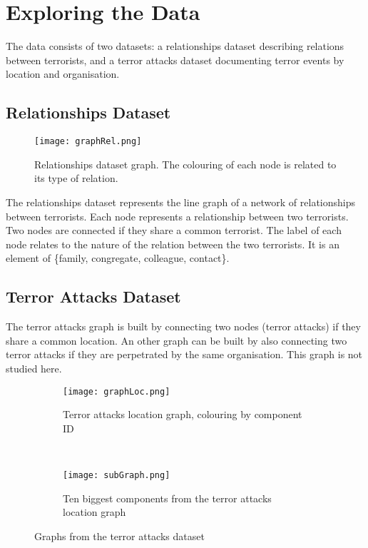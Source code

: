 \section{Exploring the Data}
\label{sec:Exploring the Data}

The data consists of two datasets: a relationships dataset describing relations between terrorists, and a terror attacks dataset documenting terror events by location and organisation.

\subsection{Relationships Dataset}
\label{subsec:Relationships Dataset}
\begin{figure}[H]
\begin{center}

        \texttt{[image: graphRel.png]}
        \label{fig:graphLoc}
        \caption{Relationships dataset graph. The colouring of each node is related to its type of relation.}
        
\end{center}
\end{figure}

The relationships dataset represents the line graph of a network of relationships between terrorists. Each node represents a relationship between two terrorists. Two nodes are connected if they share a common terrorist. %
The label of each node relates to the nature of the relation between the two terrorists. It is an element of \{family, congregate, colleague, contact\}.

\subsection{Terror Attacks Dataset}
\label{subsec:Terror Attacks Dataset}

The terror attacks graph is built by connecting two nodes (terror attacks) if they share a common location. An other graph can be built by also connecting two terror attacks if they are perpetrated by the same organisation. This graph is not studied here.

\begin{figure}[t]
\begin{center}
    \begin{subfigure}[b]{0.45\textwidth}
        \texttt{[image: graphLoc.png]}
        \caption{Terror attacks location graph, colouring by component ID}
        \label{fig:graphLoc}
    \end{subfigure}
    ~
    \begin{subfigure}[b]{0.45\textwidth}
        \texttt{[image: subGraph.png]}
        \caption{Ten biggest components from the terror attacks location graph}
        \label{fig:subGraph}
    \end{subfigure}
\caption{Graphs from the terror attacks dataset}
\label{fig:graphPlots}
\end{center}
\end{figure}


